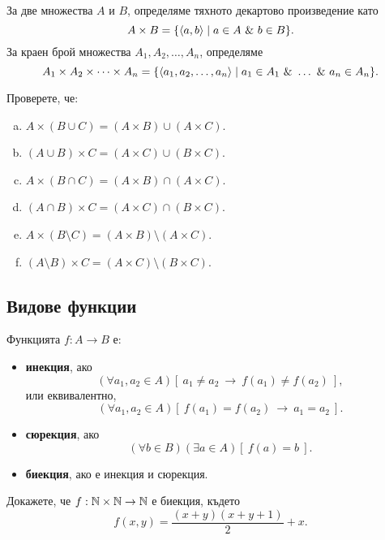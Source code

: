 За две множества $A$ и $B$, определяме тяхното декартово произведение като
\[A\times B = \{\langle{a,b}\rangle\mid a\in A\ \&\ b\in B\}.\]
За краен брой множества $A_1,A_2,\dots,A_n$, определяме
\[A_1\times A_2\times\cdots\times A_n = \{\pair{a_1,a_2,\dots,a_n}\mid a_1 \in A_1\ \&\ \dots\ \&\ a_n \in A_n\}.\]

\begin{problem}
  Проверете, че:
  \begin{enumerate}[a)]
  \item
    $A\times(B\cup C) = (A\times B) \cup (A\times C)$.
  \item
    $(A\cup B)\times C = (A\times C)\cup (B\times C)$.
  \item 
    $A\times(B\cap C) = (A\times B) \cap (A\times C)$.
  \item
    $(A \cap B)\times C = (A \times C)\cap(B\times C)$.
  \item 
    $A\times(B\setminus C) = (A\times B) \setminus (A\times C)$.
  \item
    $(A\setminus B)\times C = (A\times C)\setminus (B\times C)$.
  \end{enumerate}
\end{problem}


\subsection*{Видове функции}

Функцията $f:A \to B$ е:
\begin{itemize}
\item
  {\bf инекция}, ако 
  \[(\forall a_1,a_2\in A)[\ a_1\neq a_2\ \to\ f(a_1)\neq f(a_2)\ ],\]
  или еквивалентно,
  \[(\forall a_1,a_2\in A)[\ f(a_1) = f(a_2)\ \to\ a_1 = a_2\ ].\]
\item
  {\bf сюрекция}, ако 
  \[(\forall b\in B)(\exists a\in A)[\ f(a) = b\ ].\]
\item
  {\bf биекция}, ако е инекция и сюрекция.
\end{itemize}

\begin{problem}
  Докажете, че $f: \mathbb{N} \times \mathbb{N}\rightarrow \mathbb{N}$ е биекция, където
  \[f(x, y) = \frac{(x+y)(x+y+1)}{2} + x.\]
\end{problem}


